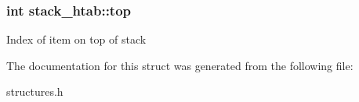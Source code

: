 \subsubsection[{top}]{\setlength{\rightskip}{0pt plus 5cm}int stack\+\_\+htab\+::top}\label{structstack__htab_a1bb9f9cb590d2082d0b202f0be999a74}
Index of item on top of stack 

The documentation for this struct was generated from the following file\+:\begin{DoxyCompactItemize}
\item 
structures.\+h\end{DoxyCompactItemize}
